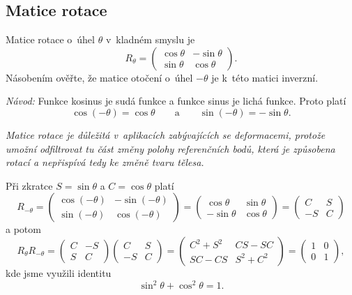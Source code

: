 \konec

\subsection{Matice rotace}
Matice rotace o úhel $\theta$ v kladném smyslu je
\begin{equation*}R_\theta=
  \begin{pmatrix}
    \cos\theta & -\sin \theta\\
    \sin\theta & \cos\theta
  \end{pmatrix}.
\end{equation*}
Násobením ověřte, že matice otočení o úhel $-\theta$ je k této matici inverzní.

\textit{Návod:} Funkce kosinus je sudá funkce a funkce sinus je lichá funkce. Proto platí $$\cos(-\theta)=\cos \theta \qquad\text{a}\qquad \sin(-\theta)=-\sin \theta.$$

\textit{Matice rotace je důležitá v aplikacích zabývajících se deformacemi, protože umožní odfiltrovat tu část změny polohy referenčních bodů, která je způsobena rotací a nepřispívá tedy ke změně tvaru tělesa.}

\reseni
Při zkratce $S=\sin \theta$ a $C=\cos\theta$ platí
\begin{equation*}
  R_{-\theta}=\begin{pmatrix} \cos(-\theta) & -\sin(-\theta) \\ \sin(-\theta) & \cos(-\theta)    
  \end{pmatrix}
  =\begin{pmatrix} \cos \theta  & \sin \theta \\ -\sin\theta & \cos\theta    
  \end{pmatrix}
  =
  \begin{pmatrix}
    C & S\\ -S & C
  \end{pmatrix}
\end{equation*}
a potom
\begin{equation*}
  R_\theta R_{-\theta}=
  \begin{pmatrix}
    C & -S \\ S& C
  \end{pmatrix}
  \begin{pmatrix}
    C & S\\ -S & C
  \end{pmatrix}
  =
  \begin{pmatrix}
    C^2+S^2 & CS-SC
\\ SC-CS & S^2+C^2
\end{pmatrix}
=
\begin{pmatrix}
  1 & 0 \\0& 1
\end{pmatrix},
\end{equation*}
kde jsme využili identitu
\begin{equation*}
  \sin^2\theta + \cos^2\theta=1.
\end{equation*}

